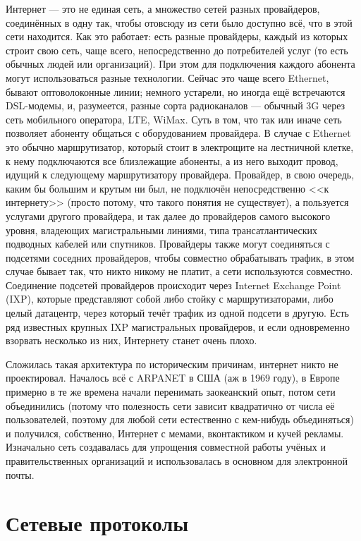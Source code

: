 \documentclass{../../text-style}
\begin{document}
Интернет --- это не единая сеть, а множество сетей разных провайдеров, соединённых в одну так, чтобы отовсюду из сети было доступно всё, что в этой сети находится. Как это работает: есть разные провайдеры, каждый из которых строит свою сеть, чаще всего, непосредственно до потребителей услуг (то есть обычных людей или организаций). При этом для подключения каждого абонента могут использоваться разные технологии. Сейчас это чаще всего Ethernet, бывают оптоволоконные линии; немного устарели, но иногда ещё встречаются DSL-модемы, и, разумеется, разные сорта радиоканалов --- обычный 3G через сеть мобильного оператора, LTE, WiMax. Суть в том, что так или иначе сеть позволяет абоненту общаться с оборудованием провайдера. В случае с Ethernet это обычно маршрутизатор, который стоит в электрощите на лестничной клетке, к нему подключаются все близлежащие абоненты, а из него выходит провод, идущий к следующему маршрутизатору провайдера. Провайдер, в свою очередь, каким бы большим и крутым ни был, не подключён непосредственно <<к интернету>> (просто потому, что такого понятия не существует), а пользуется услугами другого провайдера, и так далее до провайдеров самого высокого уровня, владеющих магистральными линиями, типа трансатлантических подводных кабелей или спутников. Провайдеры также могут соединяться с подсетями соседних провайдеров, чтобы совместно обрабатывать трафик, в этом случае бывает так, что никто никому не платит, а сети используются совместно. Соединение подсетей провайдеров происходит через Internet Exchange Point (IXP), которые представляют собой либо стойку с маршрутизаторами, либо целый датацентр, через который течёт трафик из одной подсети в другую. Есть ряд известных крупных IXP магистральных провайдеров, и если одновременно взорвать несколько из них, Интернету станет очень плохо.

Сложилась такая архитектура по историческим причинам, интернет никто не проектировал. Началось всё с ARPANET в США (аж в 1969 году), в Европе примерно в те же времена начали перенимать заокеанский опыт, потом сети объединились (потому что полезность сети зависит квадратично от числа её пользователей, поэтому для любой сети естественно с кем-нибудь объединяться) и получился, собственно, Интернет с мемами, вконтактиком и кучей рекламы. Изначально сеть создавалась для упрощения совместной работы учёных и правительственных организаций и использовалась в основном для электронной почты.

\section{Сетевые протоколы}
\end{document}
